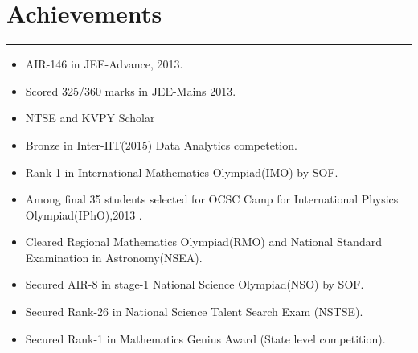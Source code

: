 \documentclass[a4paper]{article}
\begin{document}
 \section*{Achievements}
 \hrule
 \vspace{3mm}
  \begin{itemize}
   \item AIR-146 in JEE-Advance, 2013.	
   \item Scored 325/360 marks in JEE-Mains 2013.
   \item NTSE and KVPY Scholar 
   \item Bronze in Inter-IIT(2015) Data Analytics competetion.
   \item Rank-1 in International Mathematics Olympiad(IMO) by SOF.
   \item Among final 35 students selected for OCSC Camp for International Physics Olympiad(IPhO),2013 .
   \item Cleared Regional Mathematics Olympiad(RMO) and National Standard Examination in Astronomy(NSEA).
   \item Secured AIR-8 in stage-1 National Science Olympiad(NSO) by SOF.
   \item Secured Rank-26 in National Science Talent Search Exam (NSTSE).
   \item Secured Rank-1 in Mathematics Genius Award (State level competition).  
  \end{itemize}
 
 
\end{document}
